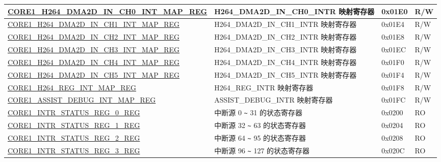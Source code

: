 \begin{longtable}{ | p{8.7cm} | p{6.2cm} | p{1.3cm} | p{1cm} | }
\hyperref[regdesc:CORE1H264DMA2DINCH0INTMAPREG]{CORE1\_H264\_DMA2D\_IN\_CH0\_INT\_MAP\_REG} & H264\_DMA2D\_IN\_CH0\_INTR 映射寄存器 & 0x01E0 & R/W \\ \hline

\hyperref[regdesc:CORE1H264DMA2DINCH1INTMAPREG]{CORE1\_H264\_DMA2D\_IN\_CH1\_INT\_MAP\_REG} & H264\_DMA2D\_IN\_CH1\_INTR 映射寄存器 & 0x01E4 & R/W \\ \hline

\hyperref[regdesc:CORE1H264DMA2DINCH2INTMAPREG]{CORE1\_H264\_DMA2D\_IN\_CH2\_INT\_MAP\_REG} & H264\_DMA2D\_IN\_CH2\_INTR 映射寄存器 & 0x01E8 & R/W \\ \hline

\hyperref[regdesc:CORE1H264DMA2DINCH3INTMAPREG]{CORE1\_H264\_DMA2D\_IN\_CH3\_INT\_MAP\_REG} & H264\_DMA2D\_IN\_CH3\_INTR 映射寄存器 & 0x01EC & R/W \\ \hline

\hyperref[regdesc:CORE1H264DMA2DINCH4INTMAPREG]{CORE1\_H264\_DMA2D\_IN\_CH4\_INT\_MAP\_REG} & H264\_DMA2D\_IN\_CH4\_INTR 映射寄存器 & 0x01F0 & R/W \\ \hline

\hyperref[regdesc:CORE1H264DMA2DINCH5INTMAPREG]{CORE1\_H264\_DMA2D\_IN\_CH5\_INT\_MAP\_REG} & H264\_DMA2D\_IN\_CH5\_INTR 映射寄存器 & 0x01F4 & R/W \\ \hline

\hyperref[regdesc:CORE1H264REGINTMAPREG]{CORE1\_H264\_REG\_INT\_MAP\_REG} & H264\_REG\_INTR 映射寄存器 & 0x01F8 & R/W \\ \hline

\hyperref[regdesc:CORE1ASSISTDEBUGINTMAPREG]{CORE1\_ASSIST\_DEBUG\_INT\_MAP\_REG} & ASSIST\_DEBUG\_INTR 映射寄存器 & 0x01FC & R/W \\ \hline

\hyperref[regdesc:CORE1INTRSTATUSREG0REG]{CORE1\_INTR\_STATUS\_REG\_0\_REG} & 中断源 0 \verb+~+ 31 的状态寄存器 & 0x0200 & RO \\ \hline

\hyperref[regdesc:CORE1INTRSTATUSREG1REG]{CORE1\_INTR\_STATUS\_REG\_1\_REG} & 中断源 32 \verb+~+ 63 的状态寄存器 & 0x0204 & RO \\ \hline

\hyperref[regdesc:CORE1INTRSTATUSREG2REG]{CORE1\_INTR\_STATUS\_REG\_2\_REG} & 中断源 64 \verb+~+ 95 的状态寄存器 & 0x0208 & RO \\ \hline

\hyperref[regdesc:CORE1INTRSTATUSREG3REG]{CORE1\_INTR\_STATUS\_REG\_3\_REG} & 中断源 96 \verb+~+ 127 的状态寄存器 & 0x020C & RO \\ \hline


\end{longtable}

